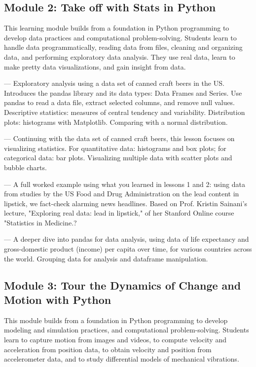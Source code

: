 \documentclass[10pt,journal,compsoc]{IEEEtran}
\begin{document}
\subsection*{Module 2: Take off with Stats in Python}
This learning module builds from a foundation in Python programming to develop data practices and computational problem-solving. 
Students learn to handle data programmatically, reading data from files, cleaning and organizing data, and performing exploratory data analysis. 
They use real data, learn to make pretty data visualizations, and gain insight from data.

\begin{description}[style=unboxed]

\item[Lesson 1: Cheers! Stats with beers]---
Exploratory analysis using a data set of canned craft beers in the US. Introduces the pandas library and its data types: Data Frames and Series. Use pandas to read a data file, extract selected columns, and remove null values. Descriptive statistics: measures of central tendency and variability. Distribution plots: histograms with Matplotlib. Comparing with a normal distribution.

\item[Lesson 2: Seeing stats in a new light]---
Continuing with the data set of canned craft beers, this lesson focuses on visualizing statistics. For quantitative data: histograms and box plots; for categorical data: bar plots. Visualizing multiple data with scatter plots and bubble charts.

\item[Lesson 3: Lead in lipstick]---
A full worked example using what you learned in lessons 1 and 2: using data from studies by the US Food and Drug Administration on the lead content in lipstick, we fact-check alarming news headlines. Based on Prof. Kristin Sainani's lecture, "Exploring real data: lead in lipstick," of her Stanford Online course "Statistics in Medicine.?

\item[Lesson 4: Life expectancy and wealth]---
A deeper dive into pandas for data analysis, using data of life expectancy and gross-domestic product (income) per capita over time, for various countries across the world. Grouping data for analysis and dataframe manipulation.

\end{description}

\subsection*{Module 3: Tour the Dynamics of Change and Motion with Python}
This module builds from a foundation in Python programming to develop modeling and simulation practices, and computational problem-solving. 
Students learn to capture motion from images and videos, to compute velocity and acceleration from position data, to obtain velocity and position from accelerometer data, and to study differential models of mechanical vibrations.
\end{document}
